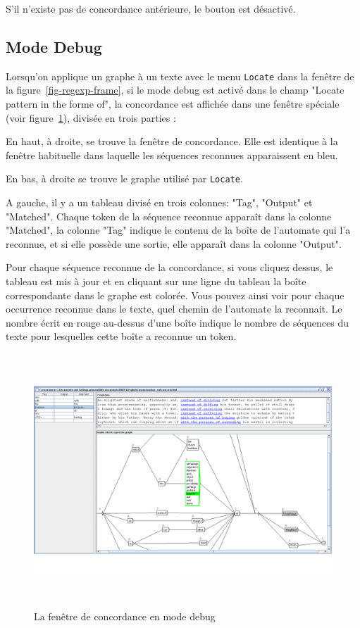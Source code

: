 \bigskip
\noindent S'il n'existe pas de concordance antérieure, le bouton est désactivé.

\subsection{Mode Debug}
\label{section-debug-mode}
Lorsqu'on applique un graphe à un texte avec le menu \verb+Locate+ dans la fenêtre de la
figure~\ref{fig-regexp-frame}, si le mode debug est activé dans le champ "Locate pattern in the
forme of", la concordance est affichée dans une fenêtre spéciale (voir figure~\ref{fig-debug-mode}),
divisée en trois parties :

\medskip 
\indent En haut, à droite, se trouve la fenêtre de concordance. Elle est identique à la fenêtre habituelle dans laquelle les séquences reconnues apparaissent en bleu.

\medskip
\indent En bas, à droite se trouve le graphe utilisé par \verb+Locate+.

\medskip
\indent A gauche, il y a un tableau divisé en trois colonnes: "Tag", "Output" et "Matched".
Chaque token de la séquence reconnue apparaît dans la colonne "Matched", la colonne "Tag" indique le
contenu de la boîte de l'automate qui l'a reconnue, et si elle possède une sortie, elle apparaît
dans la colonne "Output".

\bigskip
\noindent Pour chaque séquence reconnue de la concordance, si vous cliquez dessus, le tableau est
mis à jour et en cliquant sur une ligne du tableau la boîte correspondante dans le graphe est
colorée.
Vous pouvez ainsi voir pour chaque occurrence reconnue dans le texte, quel chemin de l'automate la
reconnait. Le nombre écrit en rouge au-dessus d'une boîte indique le nombre de  séquences du texte
pour lesquelles cette boîte a reconnue un token.

\bigskip
\begin{figure}[h]
\begin{center}
\includegraphics[height=9.5cm]{resources/img/fig6-34.png}
\caption{La fenêtre de concordance en mode debug\label{fig-debug-mode}}
\end{center}
\end{figure}
